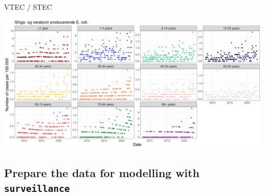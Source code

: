 \documentclass[aspectratio=169]{beamer}
\begin{document}
\begin{frame}{VTEC / STEC}
\tiny

\includegraphics[width=1\linewidth]{../figures/ShigaogveratoxinproducerendeEcolixAgeGroup}

\normalsize
\end{frame}

\hypertarget{prepare-the-data-for-modelling-with-surveillance}{%
\subsection{\texorpdfstring{Prepare the data for modelling with
\texttt{surveillance}}{Prepare the data for modelling with surveillance}}\label{prepare-the-data-for-modelling-with-surveillance}}
\end{document}
